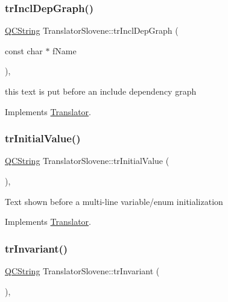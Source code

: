 \subsubsection{\texorpdfstring{trInclDepGraph()}{trInclDepGraph()}}
{\footnotesize\ttfamily \mbox{\hyperlink{class_q_c_string}{Q\+C\+String}} Translator\+Slovene\+::tr\+Incl\+Dep\+Graph (\begin{DoxyParamCaption}\item[{const char $\ast$}]{f\+Name }\end{DoxyParamCaption})\hspace{0.3cm}{\ttfamily [inline]}, {\ttfamily [virtual]}}

this text is put before an include dependency graph 

Implements \mbox{\hyperlink{class_translator}{Translator}}.

\mbox{\label{class_translator_slovene_a32e4eae26732fe8fb615f837d6253fb7}} 
\subsubsection{\texorpdfstring{trInitialValue()}{trInitialValue()}}
{\footnotesize\ttfamily \mbox{\hyperlink{class_q_c_string}{Q\+C\+String}} Translator\+Slovene\+::tr\+Initial\+Value (\begin{DoxyParamCaption}{ }\end{DoxyParamCaption})\hspace{0.3cm}{\ttfamily [inline]}, {\ttfamily [virtual]}}

Text shown before a multi-\/line variable/enum initialization 

Implements \mbox{\hyperlink{class_translator}{Translator}}.

\mbox{\label{class_translator_slovene_aa3d5f9667fe79802a5eab427a9bea4c8}} 
\subsubsection{\texorpdfstring{trInvariant()}{trInvariant()}}
{\footnotesize\ttfamily \mbox{\hyperlink{class_q_c_string}{Q\+C\+String}} Translator\+Slovene\+::tr\+Invariant (\begin{DoxyParamCaption}{ }\end{DoxyParamCaption})\hspace{0.3cm}{\ttfamily [inline]}, {\ttfamily [virtual]}}

